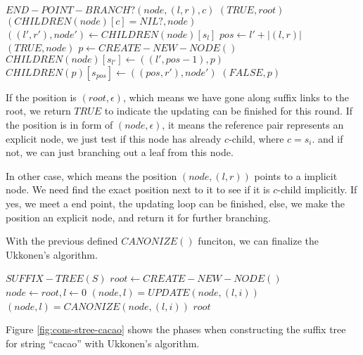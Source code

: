 \documentclass{article}
\begin{document}
\begin{algorithmic}
\STATE $END-POINT-BRANCH?(node, (l, r), c)$
      \RETURN $(TRUE, root)$
    \ELSE
      \RETURN $(CHILDREN(node)[c] = NIL?, node)$
    \ENDIF
  \ELSE
    \STATE $((l', r'), node') \leftarrow CHILDREN(node)[s_l]$
    \STATE $pos \leftarrow l'+|(l, r)|$
      \RETURN $(TRUE, node)$
    \ELSE
      \STATE $p \leftarrow CREATE-NEW-NODE()$
      \STATE $CHILDREN(node)[s_{l'}] \leftarrow ((l', pos-1), p)$
      \STATE $CHILDREN(p)[s_{pos}] \leftarrow ((pos, r'), node')$
      \RETURN $(FALSE, p)$
    \ENDIF
  \ENDIF
\end{algorithmic}

If the position is $(root, \epsilon)$, which means we have gone along suffix links to
the root, we return $TRUE$ to indicate the updating can be finished for this round.
If the position is in form of $(node, \epsilon)$, it means the reference pair represents
an explicit node, we just test if this node has already $c$-child, where $c=s_i$. and
if not, we can just branching out a leaf from this node.

In other case, which means the position $(node, (l, r))$ points to a implicit node.
We need find the exact position next to it to see if it is $c$-child implicitly.
If yes, we meet a end point, the updating loop can be finished, else, we make
the position an explicit node, and return it for further branching.

With the previous defined $CANONIZE()$ funciton, we can finalize the Ukkonen's algorithm.

\begin{algorithmic}
\STATE $SUFFIX-TREE(S)$
  \STATE $root \leftarrow CREATE-NEW-NODE()$
  \STATE $node \leftarrow root, l \leftarrow 0$
    \STATE $(node, l) = UPDATE(node, (l, i))$
    \STATE $(node, l) = CANONIZE(node, (l, i))$
  \ENDFOR
  \RETURN $root$
\end{algorithmic}

Figure \ref{fig:cons-stree-cacao} shows the phases when constructing the
suffix tree for string ``cacao'' with Ukkonen's algorithm.
\end{document}

